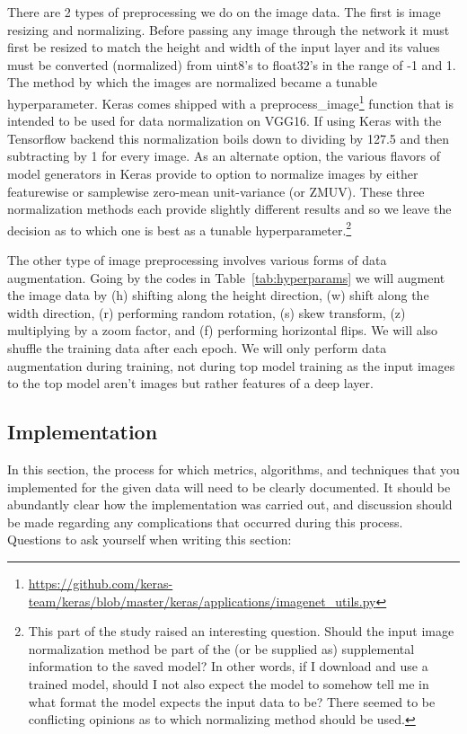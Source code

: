 \documentclass[12pt,journal,compsoc]{IEEEtran}
\begin{document}
There are 2 types of preprocessing we do on the image data. The first is image resizing and normalizing. Before passing any image through the network it must first be resized to match the height and width of the input layer and its values must be converted (normalized) from uint8's to float32's in the range of -1 and 1.  The method by which the images are normalized became a tunable hyperparameter.  Keras comes shipped with a preprocess\_image\footnote{\url{https://github.com/keras-team/keras/blob/master/keras/applications/imagenet_utils.py}} function that is intended to be used for data normalization on VGG16.  If using Keras with the Tensorflow backend this normalization boils down to dividing by 127.5 and then subtracting by 1 for every image.  As an alternate option, the various flavors of model generators in Keras provide to option to normalize images by either featurewise or samplewise zero-mean unit-variance (or ZMUV).  These three normalization methods each provide slightly different results and so we leave the decision as to which one is best as a tunable hyperparameter.\footnote{This part of the study raised an interesting question. Should the input image normalization method be part of the (or be supplied as) supplemental information to the saved model?  In other words, if I download and use a trained model, should I not also expect the model to somehow tell me in what format the model expects the input data to be? There seemed to be conflicting opinions as to which normalizing method should be used.}

The other type of image preprocessing involves various forms of data augmentation.  Going by the codes in Table~\ref{tab:hyperparams} we will augment the image data by (h) shifting along the height direction, (w) shift along the width direction, (r) performing random rotation, (s) skew transform, (z) multiplying by a zoom factor, and (f) performing horizontal flips.  We will also shuffle the training data after each epoch. We will only perform data augmentation during training, not during top model training as the input images to the top model aren't images but rather features of a deep layer.


\subsection{Implementation}
In this section, the process for which metrics, algorithms, and techniques that you implemented for the given data will need to be clearly documented. It should be abundantly clear how the implementation was carried out, and discussion should be made regarding any complications that occurred during this process. Questions to ask yourself when writing this section:
\end{document}

